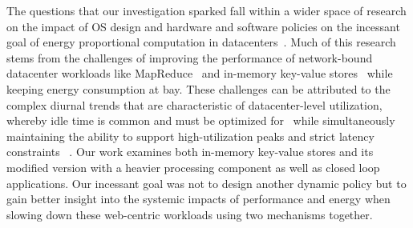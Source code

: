 \label{sec:related}







The questions that our investigation sparked fall within a wider space of research on the impact of OS design and hardware and software policies on the incessant goal of energy proportional computation in datacenters~\cite{energyproportion, warehouse-power, 268014}. Much of this research stems from the challenges of improving the performance of network-bound datacenter workloads like MapReduce~\cite{large-scale-mapreduce} and in-memory key-value stores~\cite{mica, zygos} while keeping energy consumption at bay. These challenges can be attributed to
the complex diurnal trends that are characteristic of datacenter-level utilization, whereby idle time is common and must be optimized for~\cite{hotpower2008, powernap, napsac} while simultaneously maintaining the ability to support high-utilization peaks and strict latency constraints ~\cite{Dynamo, SmoothOperator, oldi-pegasus, adrenaline, rubik, eurosys14, zygos, peafowl, 7425206, 10.1145/2830772.2830779, dreamweaver, dynsleep, udpm}. Our work examines both in-memory key-value stores and its modified version with a heavier processing component as well as closed loop applications. Our incessant goal was not to design another dynamic policy but to gain better insight into the systemic impacts of performance and energy when slowing down these web-centric workloads using two mechanisms together.

